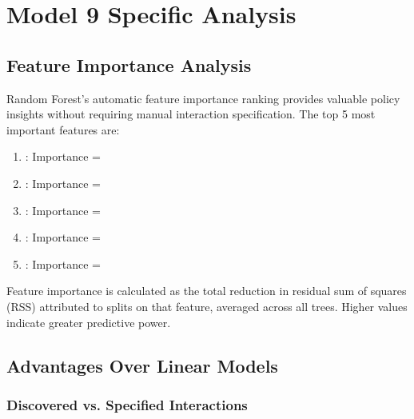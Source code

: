 


\section{Model 9 Specific Analysis}

\subsection{Feature Importance Analysis}

Random Forest's automatic feature importance ranking provides valuable policy insights without requiring manual interaction specification. The top 5 most important features are:

\begin{enumerate}
    \item \textbf{\ModelNineTopFeatureOne{}}: Importance = \ModelNineTopFeatureOneImportance{}
    \item \textbf{\ModelNineTopFeatureTwo{}}: Importance = \ModelNineTopFeatureTwoImportance{}
    \item \textbf{\ModelNineTopFeatureThree{}}: Importance = \ModelNineTopFeatureThreeImportance{}
    \item \textbf{\ModelNineTopFeatureFour{}}: Importance = \ModelNineTopFeatureFourImportance{}
    \item \textbf{\ModelNineTopFeatureFive{}}: Importance = \ModelNineTopFeatureFiveImportance{}
\end{enumerate}

Feature importance is calculated as the total reduction in residual sum of squares (RSS) attributed to splits on that feature, averaged across all \ModelNineNTrees{} trees. Higher values indicate greater predictive power.

\subsection{Advantages Over Linear Models}

\subsubsection{Discovered vs. Specified Interactions}

